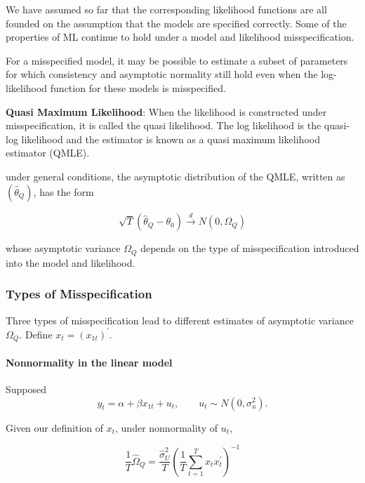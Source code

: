 \documentclass[11pt]{article}
\begin{document}
We have assumed so far that the corresponding likelihood functions are all founded on the assumption that the models are specified correctly. Some of the properties of ML continue to hold under a model and likelihood misspecification.
\begin{example}
    For a misspecified model, it may be possible to estimate a subset of parameters for which consistency and asymptotic normality still hold even when the log-likelihood function for these models is misspecified.
\end{example}

\begin{definition}
    \textbf{Quasi Maximum Likelihood}: When the likelihood is constructed under misspecification, it is called the quasi likelihood. The log likelihood is the quasi-log likelihood and the estimator is known as a quasi maximum likelihood estimator (QMLE).
\end{definition}

under general conditions, the asymptotic distribution of the QMLE, written as $(\hat{\theta}_Q)$, has the form

\begin{equation}
\sqrt{T}\left(\hat{\theta}_Q-\theta_0\right) \stackrel{d}{\rightarrow} N\left(0, \Omega_Q\right)
\end{equation}

whose asymptotic variance $\Omega_Q$ depends on the type of misspecification introduced into the model and likelihood.

\subsubsection{Types of Misspecification}

Three types of misspecification lead to different estimates of asymptotic variance $\Omega_Q$. Define $x_t = (x_{1t})^\prime$.


\paragraph{Nonnormality in the linear model} \mbox{}

Supposed
\[y_t = \alpha + \beta x_{1t} + u_t, \qquad u_t \sim N(0,\sigma^2_u).\]

Given our definition of $x_t$, under nonnormality of $u_t$,

\begin{equation}
\frac{1}{T} \widehat{\Omega}_Q=\frac{\widehat{\sigma}_U^2}{T}\left(\frac{1}{T} \sum_{t=1}^T x_t x_t^{\prime}\right)^{-1}
\end{equation}
\end{document}
